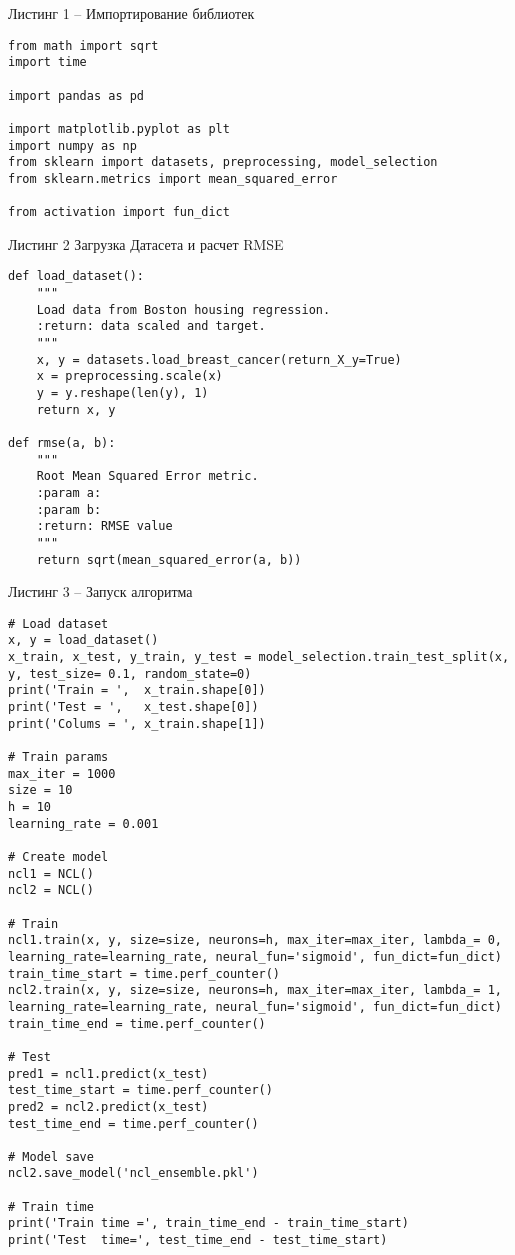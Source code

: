\documentclass[12pt]{extarticle}
\begin{document}
Листинг 1 -- Импортирование библиотек

\begin{lstlisting}
from math import sqrt
import time

import pandas as pd

import matplotlib.pyplot as plt
import numpy as np
from sklearn import datasets, preprocessing, model_selection
from sklearn.metrics import mean_squared_error

from activation import fun_dict
\end{lstlisting}

Листинг 2 Загрузка Датасета и расчет RMSE

\begin{lstlisting}
def load_dataset():
    """
    Load data from Boston housing regression.
    :return: data scaled and target.
    """
    x, y = datasets.load_breast_cancer(return_X_y=True)
    x = preprocessing.scale(x)
    y = y.reshape(len(y), 1)
    return x, y

def rmse(a, b):
    """
    Root Mean Squared Error metric.
    :param a:
    :param b:
    :return: RMSE value
    """
    return sqrt(mean_squared_error(a, b)) 
\end{lstlisting}

\newpage %

Листинг 3 -- Запуск алгоритма

\begin{lstlisting}
# Load dataset
x, y = load_dataset()
x_train, x_test, y_train, y_test = model_selection.train_test_split(x, y, test_size= 0.1, random_state=0)
print('Train = ',  x_train.shape[0])
print('Test = ',   x_test.shape[0])
print('Colums = ', x_train.shape[1])

# Train params
max_iter = 1000
size = 10
h = 10                  
learning_rate = 0.001

# Create model
ncl1 = NCL()
ncl2 = NCL()

# Train
ncl1.train(x, y, size=size, neurons=h, max_iter=max_iter, lambda_= 0, learning_rate=learning_rate, neural_fun='sigmoid', fun_dict=fun_dict)
train_time_start = time.perf_counter()
ncl2.train(x, y, size=size, neurons=h, max_iter=max_iter, lambda_= 1, learning_rate=learning_rate, neural_fun='sigmoid', fun_dict=fun_dict)
train_time_end = time.perf_counter()

# Test
pred1 = ncl1.predict(x_test)
test_time_start = time.perf_counter()
pred2 = ncl2.predict(x_test)
test_time_end = time.perf_counter()

# Model save
ncl2.save_model('ncl_ensemble.pkl')

# Train time
print('Train time =', train_time_end - train_time_start)
print('Test  time=', test_time_end - test_time_start)
\end{lstlisting}
\end{document}
